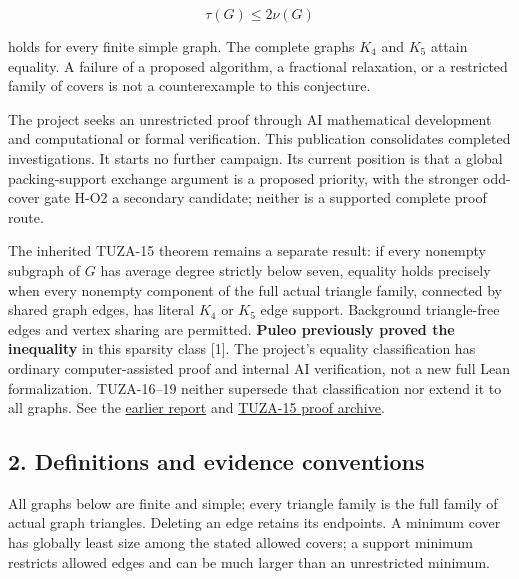 \documentclass[11pt,a4paper]{article}
\begin{document}
\[\tau(G)\le2\nu(G)\]

holds for every finite simple graph. The complete graphs \(K_4\) and \(K_5\) attain equality. A failure of a proposed algorithm, a fractional relaxation, or a restricted family of covers is not a counterexample to this conjecture.

The project seeks an unrestricted proof through AI mathematical development and computational or formal verification. This publication consolidates completed investigations. It starts no further campaign. Its current position is that a global packing-support exchange argument is a proposed priority, with the stronger odd-cover gate H-O2 a secondary candidate; neither is a supported complete proof route.

The inherited TUZA-15 theorem remains a separate result: if every nonempty subgraph of \(G\) has average degree strictly below seven, equality holds precisely when every nonempty component of the full actual triangle family, connected by shared graph edges, has literal \(K_4\) or \(K_5\) edge support. Background triangle-free edges and vertex sharing are permitted. \textbf{Puleo previously proved the inequality} in this sparsity class {[}1{]}. The project's equality classification has ordinary computer-assisted proof and internal AI verification, not a new full Lean formalization. TUZA-16--19 neither supersede that classification nor extend it to all graphs. See the \href{https://github.com/pappa211/ai-math-experiments/blob/main/papers/tuza-11-15-research-summary/main.md}{earlier report} and \href{https://github.com/pappa211/ai-math-experiments/blob/main/problems/TUZA-15/README.md}{TUZA-15 proof archive}.

\subsection{2. Definitions and evidence conventions}\label{definitions-and-evidence-conventions}

All graphs below are finite and simple; every triangle family is the full family of actual graph triangles. Deleting an edge retains its endpoints. A minimum cover has globally least size among the stated allowed covers; a support minimum restricts allowed edges and can be much larger than an unrestricted minimum.
\end{document}
